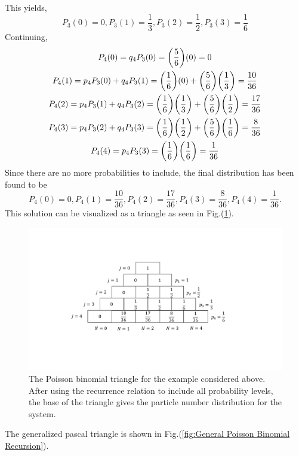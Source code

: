 This yields,
\begin{equation*}
    P_3(0)=0, P_3(1)=\frac{1}{3}, P_3(2)=\frac{1}{2}, P_3(3)=\frac{1}{6}
\end{equation*}
Continuing,
\begin{gather*}
    P_4(0)=q_4 P_3(0)=\qty(\frac{5}{6})(0)=0\\
    P_4(1)=p_4 P_{3}(0)+q_4 P_{3}(1)=\qty(\frac{1}{6})(0)+\qty(\frac{5}{6})\qty(\frac{1}{3})=\frac{10}{36}\\
    P_4(2)=p_4 P_{3}(1)+q_4 P_{3}(2)=\qty(\frac{1}{6})\qty(\frac{1}{3})+\qty(\frac{5}{6})\qty(\frac{1}{2})=\frac{17}{36}\\
    P_4(3)=p_4 P_{3}(2)+q_4 P_{3}(3)=\qty(\frac{1}{6})\qty(\frac{1}{2})+\qty(\frac{5}{6})\qty(\frac{1}{6})=\frac{8}{36}\\
    P_4(4)=p_4 P_{3}(3)=\qty(\frac{1}{6})\qty(\frac{1}{6})=\frac{1}{36}
\end{gather*}
Since there are no more probabilities to include, the final distribution has been found to be
\begin{equation*}
    P_4(0)=0, P_4(1)=\frac{10}{36}, P_4(2)=\frac{17}{36}, P_4(3)=\frac{8}{36}, P_4(4)=\frac{1}{36}.
\end{equation*}
This solution can be visualized as a triangle as seen in Fig.\@ (\ref{fig:Poisson Binomial Triangle}). 
\begin{figure}[H]
    \centering
    \includegraphics[scale=0.55]{figures/pdf/PBTriangle.pdf}
    \caption{The Poisson binomial triangle for the example considered above. After using the recurrence relation to include all probability levels, the base of the triangle gives the particle number distribution for the system.}
    \label{fig:Poisson Binomial Triangle}
\end{figure}
The generalized pascal triangle is shown in Fig.\@ (\ref{fig:General Poisson Binomial Recursion}).
